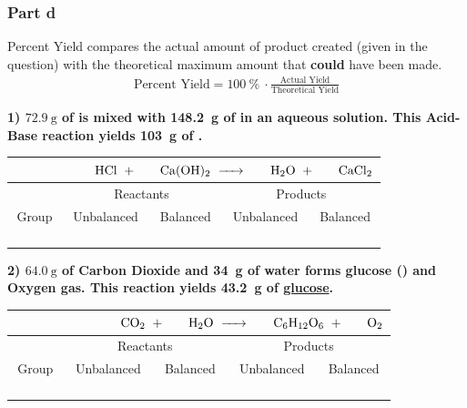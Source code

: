 \documentclass[12pt, oneside, letterpaper]{book}
\begin{document}
\subsubsection{Part d} 
Percent Yield compares the actual amount of product created (given in the question) with the theoretical maximum amount that \textbf{could} have been made. 
\begin{gather*}
    \text{Percent Yield} = 100\ \% \ \cdot \frac{\text{Actual Yield}}{\text{Theoretical Yield}}
\end{gather*}

\newpage

\textbf{1) $\qty{72.9}{\gram}$ of  is mixed with \qty{148.2}{\gram} of  in an aqueous solution. This Acid-Base reaction yields \qty{103}{\gram} of \underline{}.}
\begin{table}[H]
\centering
\begin{tabular}{|c||c|c||c|c|} 
 \multicolumn{5}{c}{$\phantom{Group 1234567}
    \ce{HCl} \ + \ 
    \phantom{123} \ce{Ca(OH)2} \ \ce{->} \ 
    \phantom{123} \ce{H2O} \ + \ 
    \phantom{123} \ce{CaCl2}$} \\
 \hline
    & \multicolumn{2}{c||}{Reactants} & \multicolumn{2}{c|}{Products} \\
 \hline
 Group & Unbalanced & Balanced & Unbalanced & Balanced\\ 
 \hline\hline
   & & & & \\
 \hline
   & & & & \\
 \hline
  & & & & \\
 \hline
  & & & & \\[1ex] 
 \hline
\end{tabular}
\end{table}

\parskip =53mm

\textbf{2) $\qty{64.0}{\gram}$ of Carbon Dioxide and \qty{34}{\gram} of water forms glucose () and Oxygen gas. This reaction yields \qty{43.2}{\gram} of \underline{glucose}.} 
\begin{table}[H]
\centering
\begin{tabular}{|c||c|c||c|c|} 
 \multicolumn{5}{c}{$\phantom{Group 12345678901}
    \ce{CO2} \ + \ 
    \phantom{123} \ce{H2O} \ \ce{->} \ 
    \phantom{123} \ce{C6H12O6} \ + \ 
    \phantom{123} \ce{O2}$} \\
 \hline
    & \multicolumn{2}{c||}{Reactants} & \multicolumn{2}{c|}{Products} \\
 \hline
 Group & Unbalanced & Balanced & Unbalanced & Balanced\\ 
 \hline\hline
   & & & & \\
 \hline
   & & & & \\
 \hline
  & & & & \\
 \hline
  & & & & \\[1ex] 
 \hline
\end{tabular}
\end{table}
\end{document}
